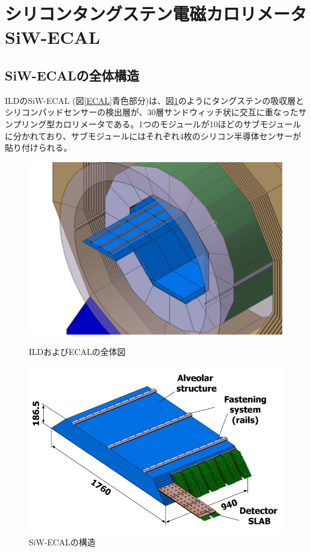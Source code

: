 \section{シリコンタングステン電磁カロリメータ SiW-ECAL}
\subsection{SiW-ECALの全体構造}
ILDのSiW-ECAL (図\ref{ECAL}青色部分)は、図\ref{SiW-ECAL}のようにタングステンの吸収層とシリコンパッドセンサーの検出層が、30層サンドウィッチ状に交互に重なったサンプリング型カロリメータである。1つのモジュールが10ほどのサブモジュールに分かれており、サブモジュールにはそれぞれ4枚のシリコン半導体センサーが貼り付けられる。
\begin{figure}[h]
 \begin{minipage}[h]{.45\linewidth}
	\begin{center}
 \includegraphics[keepaspectratio, scale=0.8]
 	{Figure/Siwecal/ECAL.png}
 		\caption[ILDおよびECALの全体図]{ILDおよびECALの全体図~\cite{tdr2}}
 		\label{ECAL}
	\end{center}
\end{minipage}
\hfill
\begin{minipage}[h]{.45\linewidth}
	\begin{center}
 \includegraphics[keepaspectratio, scale=0.8]
 	{Figure/Siwecal/SiW-ECAL.png}
 		\caption{SiW-ECALの構造}
 		\label{SiW-ECAL}
	\end{center}
\end{minipage}
\end{figure}


